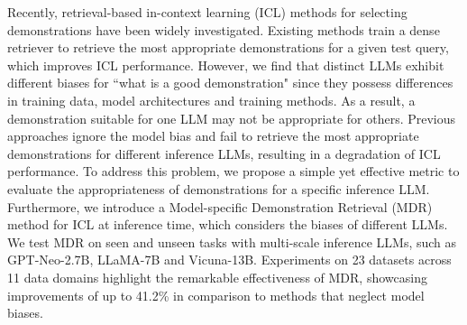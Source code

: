 Recently, retrieval-based in-context learning (ICL) methods for selecting demonstrations have been widely investigated. Existing methods train a dense retriever to retrieve the most appropriate demonstrations for a given test query, which improves ICL performance. However, we find that distinct LLMs exhibit different biases for ``what is a good demonstration" since they possess differences in training data, model architectures and training methods. As a result, a demonstration suitable for one LLM may not be appropriate for others. Previous approaches ignore the model bias and fail to retrieve the most appropriate demonstrations for different inference LLMs, resulting in a degradation of ICL performance. To address this problem, we propose a simple yet effective metric to evaluate the appropriateness of demonstrations for a specific inference LLM. Furthermore, we introduce a Model-specific Demonstration Retrieval (MDR) method for ICL at inference time, which considers the biases of different LLMs.  We test MDR on seen and unseen tasks with multi-scale inference LLMs, such as  GPT-Neo-2.7B, LLaMA-7B and Vicuna-13B. Experiments on 23 datasets across 11 data domains highlight the remarkable effectiveness of MDR, showcasing improvements of up to 41.2\% in comparison to methods that neglect model biases.